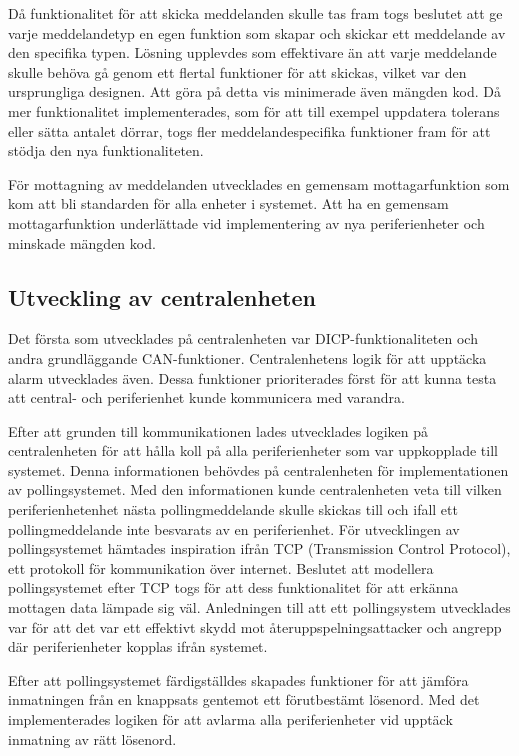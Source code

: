 \documentclass[a4paper]{article}
\begin{document}
Då funktionalitet för att skicka meddelanden skulle tas fram togs beslutet att ge varje meddelandetyp en egen funktion som skapar och skickar ett meddelande av den specifika typen.
Lösning upplevdes som effektivare än att varje meddelande skulle behöva gå genom ett flertal funktioner för att skickas, vilket var den ursprungliga designen.
Att göra på detta vis minimerade även mängden kod.
Då mer funktionalitet implementerades, som för att till exempel uppdatera tolerans eller sätta antalet dörrar, togs fler meddelandespecifika funktioner fram för att stödja den nya funktionaliteten.

För mottagning av meddelanden utvecklades  en gemensam mottagarfunktion som kom att bli standarden för alla enheter i systemet.
Att ha en gemensam mottagarfunktion underlättade vid implementering av nya periferienheter och minskade mängden kod.


\subsection{Utveckling av centralenheten}
Det första som utvecklades på centralenheten var DICP-funktionaliteten och andra grundläggande CAN-funktioner.
Centralenhetens logik för att upptäcka alarm utvecklades även.
Dessa funktioner prioriterades först för att kunna testa att central- och periferienhet kunde kommunicera med varandra.

Efter att grunden till kommunikationen lades utvecklades logiken på centralenheten för att hålla koll på alla periferienheter som var uppkopplade till systemet.
Denna informationen behövdes på centralenheten för implementationen av pollingsystemet.
Med den informationen kunde centralenheten veta till vilken periferienhetenhet nästa pollingmeddelande skulle skickas till och ifall ett pollingmeddelande inte besvarats av en periferienhet.
För utvecklingen av pollingsystemet hämtades inspiration ifrån TCP (Transmission Control Protocol), ett protokoll för kommunikation över internet.
Beslutet att modellera pollingsystemet efter TCP togs för att dess funktionalitet för att erkänna mottagen data lämpade sig väl.
Anledningen till att ett pollingsystem utvecklades var för att det var ett effektivt skydd mot återuppspelningsattacker och angrepp där periferienheter kopplas ifrån systemet.

Efter att pollingsystemet färdigställdes skapades funktioner för att jämföra inmatningen från en knappsats gentemot ett förutbestämt lösenord.
Med det implementerades logiken för att avlarma alla periferienheter vid upptäck inmatning av rätt lösenord.
\end{document}
